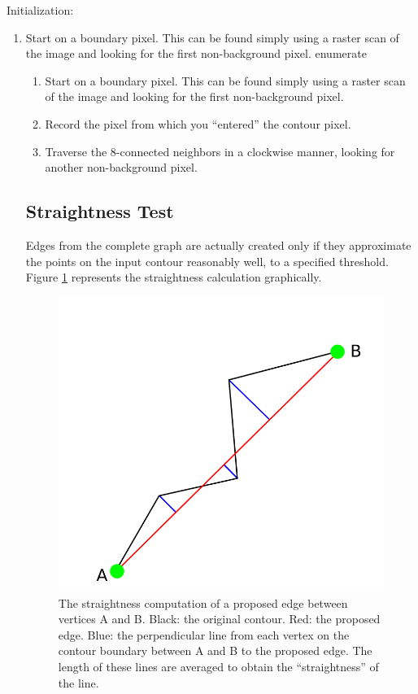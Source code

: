 \documentclass{InsightArticle}
\begin{document}
Initialization:
\begin{enumerate}
\item Start on a boundary pixel. This can be found simply using a raster scan of the image and looking for the first non-background pixel.
{enumerate}
\begin{enumerate}
  \item Start on a boundary pixel. This can be found simply using a raster scan of the image and looking for the first non-background pixel.
 \item Record the pixel from which you ``entered'' the contour pixel.
 \item Traverse the 8-connected neighbors in a clockwise manner, looking for another non-background pixel.
\end{enumerate}

\subsection{Straightness Test}
\label{sec:Algorithm:StraightnessTest}
Edges from the complete graph are actually created only if they approximate the points on the input contour reasonably well, to a specified threshold. Figure \ref{fig:Straightness} represents the straightness calculation graphically.
\begin{figure}[H]
  \centering
  \includegraphics[width=0.3\linewidth]{images/straightness}
  \caption{The straightness computation of a proposed edge between vertices A and B. Black: the original contour. Red: the proposed edge. Blue: the perpendicular line from each vertex on the contour boundary between A and B to the proposed edge. The length of these lines are averaged to obtain the ``straightness'' of the line.}
  \label{fig:Straightness}
\end{figure}


\end{enumerate}
\end{document}
